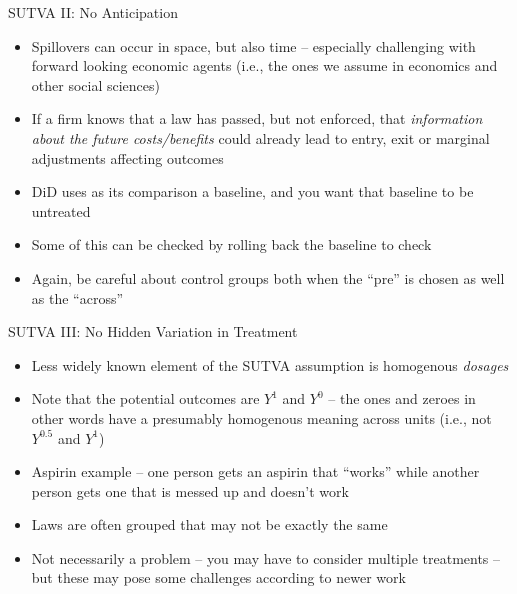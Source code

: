 \documentclass{beamer}
\begin{document}
\begin{frame}{SUTVA II: No Anticipation}

\begin{itemize}
\item Spillovers can occur in space, but also time -- especially challenging with forward looking economic agents (i.e., the ones we assume in economics and other social sciences)
\item If a firm knows that a law has passed, but not enforced, that \emph{information about the future costs/benefits} could already lead to entry, exit or marginal adjustments affecting outcomes
\item DiD uses as its comparison a baseline, and you want that baseline to be untreated
\item Some of this can be checked by rolling back the baseline to check 
\item Again, be careful about control groups both when the ``pre'' is chosen as well as the ``across''
\end{itemize}

\end{frame}

\begin{frame}{SUTVA III: No Hidden Variation in Treatment}

\begin{itemize}
\item Less widely known element of the SUTVA assumption is homogenous \emph{dosages}
\item Note that the potential outcomes are $Y^1$ and $Y^0$ -- the ones and zeroes in other words have a presumably homogenous meaning across units (i.e., not $Y^{0.5}$ and $Y^1$)
\item Aspirin example -- one person gets an aspirin that ``works'' while another person gets one that is messed up and doesn't work
\item Laws are often grouped that may not be exactly the same
\item Not necessarily a problem -- you may have to consider multiple treatments -- but these may pose some challenges according to newer work
\end{itemize}

\end{frame}
\end{document}
